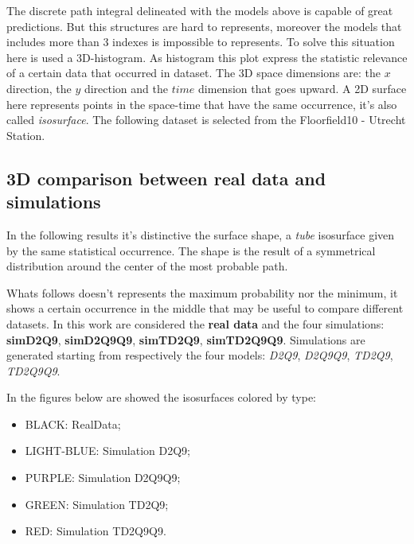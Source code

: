 \documentclass[class=article, crop=false]{standalone}
\begin{document}
The discrete path integral delineated with the models above is capable of great predictions.
But this structures are hard to represents, moreover the models that includes more than 3 indexes is impossible to represents.
To solve this situation here is used a 3D-histogram.
As histogram this plot express the statistic relevance of a certain data that occurred in dataset.
The 3D space dimensions are: the $x$ direction, the $y$ direction and the $time$ dimension that goes upward.
A 2D surface here represents points in the space-time that have the same occurrence, it's also called \emph{isosurface}.
The following dataset is selected from the Floorfield10 - Utrecht Station.

\subsection{3D comparison between real data and simulations}
In the following results it's distinctive the surface shape, a \emph{tube} isosurface given by the same statistical occurrence.
The shape is the result of a symmetrical distribution around the center of the most probable path.

Whats follows doesn't represents the maximum probability nor the minimum, it shows a certain occurrence in the middle that may be useful to compare different datasets.
In this work are considered the \textbf{real data} and the four simulations: \textbf{simD2Q9}, \textbf{simD2Q9Q9}, \textbf{simTD2Q9}, \textbf{simTD2Q9Q9}.
Simulations are generated starting from respectively the four models: \emph{D2Q9}, \emph{D2Q9Q9}, \emph{TD2Q9}, \emph{TD2Q9Q9}.

In the figures below are showed the isosurfaces colored by type:
\begin{itemize}
\item BLACK: RealData;
\item LIGHT-BLUE: Simulation D2Q9;
\item PURPLE: Simulation D2Q9Q9;
\item GREEN: Simulation TD2Q9;
\item RED: Simulation TD2Q9Q9.
\end{itemize}

\FloatBarrier
\newpage
\end{document}
